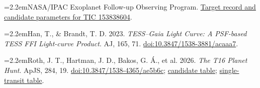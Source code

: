 \documentclass[11pt,a4paper]{article}
\newcommand{\entry}[2]{\par\noindent\hangindent=2.2em\hangafter=1\makebox[2.2em][l]{[#1]}#2\par}
\begin{document}
{\entry{12}{NASA/IPAC Exoplanet Follow-up Observing Program. \href{https://exofop.ipac.caltech.edu/tess/target.php?id=153838604}{Target record and candidate parameters for TIC 153838604}.}
\entry{13}{Han, T., \& Brandt, T. D. 2023. \emph{TESS--Gaia Light Curve: A PSF-based TESS FFI Light-curve Product}. AJ, 165, 71. \href{https://doi.org/10.3847/1538-3881/acaaa7}{doi:10.3847/1538-3881/acaaa7}.}
\entry{14}{Roth, J. T., Hartman, J. D., Bakos, G. \'A., et al. 2026. \emph{The T16 Planet Hunt}. ApJS, 284, 19. \href{https://doi.org/10.3847/1538-4365/ae5b6c}{doi:10.3847/1538-4365/ae5b6c}; \href{https://content.cld.iop.org/journals/0067-0049/284/1/19/revision1/apjsae5b6ct1_mrt.txt}{candidate table}; \href{https://content.cld.iop.org/journals/0067-0049/284/1/19/revision1/apjsae5b6ct2_mrt.txt}{single-transit table}.}
}
\end{document}
